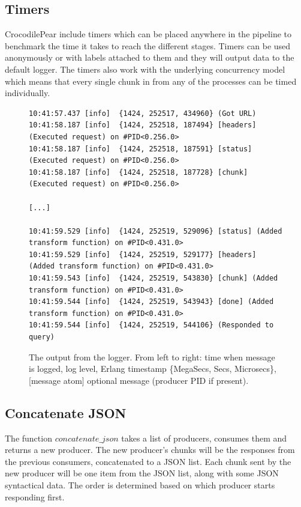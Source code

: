 \documentclass{cslthse-msc}
\begin{document}
\subsection{Timers}
CrocodilePear include timers which can be placed anywhere in the pipeline to benchmark the time it takes to reach the different stages. Timers can be used anonymously or with labels attached to them and they will output data to the default logger. The timers also work with the underlying concurrency model which means that every single chunk in from any of the processes can be timed individually.

\begin{figure}[H]
  \centering
\begin{lstlisting}[breaklines=true,frame=single]
10:41:57.437 [info]  {1424, 252517, 434960} (Got URL)
10:41:58.187 [info]  {1424, 252518, 187494} [headers] (Executed request) on #PID<0.256.0>
10:41:58.187 [info]  {1424, 252518, 187591} [status] (Executed request) on #PID<0.256.0>
10:41:58.187 [info]  {1424, 252518, 187728} [chunk] (Executed request) on #PID<0.256.0>

[...]

10:41:59.529 [info]  {1424, 252519, 529096} [status] (Added transform function) on #PID<0.431.0>
10:41:59.529 [info]  {1424, 252519, 529177} [headers] (Added transform function) on #PID<0.431.0>
10:41:59.543 [info]  {1424, 252519, 543830} [chunk] (Added transform function) on #PID<0.431.0>
10:41:59.544 [info]  {1424, 252519, 543943} [done] (Added transform function) on #PID<0.431.0>
10:41:59.544 [info]  {1424, 252519, 544106} (Responded to query)
\end{lstlisting}
  \caption{The output from the logger. From left to right: time when message is logged, log level, Erlang timestamp \{MegaSecs, Secs, Microsecs\}, [message atom] optional message (producer PID if present).}
\end{figure}

\subsection{Concatenate JSON}
The function $concatenate\_json$ takes a list of producers, consumes them and returns a new producer. The new producer's chunks will be the responses from the previous consumers, concatenated to a JSON list. Each chunk sent by the new producer will be one item from the JSON list, along with some JSON syntactical data. The order is determined based on which producer starts responding first.
\end{document}
